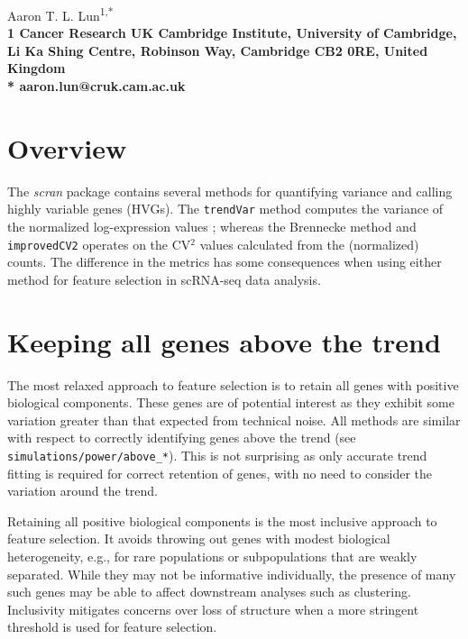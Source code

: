 \documentclass{article}
\newcommand\code[1]{{\small\texttt{#1}}}
\begin{document}
\vspace*{0.35in}

\begin{flushleft}
{\Large
\textbf{}
}
\newline

Aaron T. L. Lun\textsuperscript{1,*}
\\
\bigskip
\bf{1} Cancer Research UK Cambridge Institute, University of Cambridge, Li Ka Shing Centre, Robinson Way, Cambridge CB2 0RE, United Kingdom
\\
\bigskip
* aaron.lun@cruk.cam.ac.uk

\end{flushleft}

\section{Overview}
The \textit{scran} package contains several methods for quantifying variance and calling highly variable genes (HVGs).
The \code{trendVar} method computes the variance of the normalized log-expression values \citep{lun2016step};
whereas the Brennecke method \citep{brennecke2013accounting} and \code{improvedCV2} operates on the CV$^2$ values calculated from the (normalized) counts.
The difference in the metrics has some consequences when using either method for feature selection in scRNA-seq data analysis.

\section{Keeping all genes above the trend}
The most relaxed approach to feature selection is to retain all genes with positive biological components.
These genes are of potential interest as they exhibit some variation greater than that expected from technical noise.
All methods are similar with respect to correctly identifying genes above the trend (see \texttt{simulations/power/above\_*}).
This is not surprising as only accurate trend fitting is required for correct retention of genes, with no need to consider the variation around the trend.

Retaining all positive biological components is the most inclusive approach to feature selection.
It avoids throwing out genes with modest biological heterogeneity, e.g., for rare populations or subpopulations that are weakly separated.
While they may not be informative individually, the presence of many such genes may be able to affect downstream analyses such as clustering.
Inclusivity mitigates concerns over loss of structure when a more stringent threshold is used for feature selection.
\end{document}
